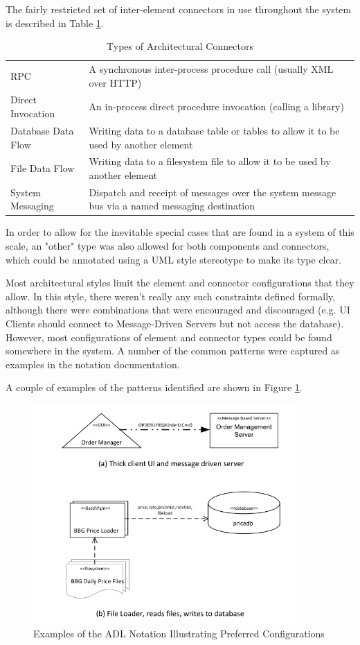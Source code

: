 The fairly restricted set of inter-element connectors in use throughout the system is described in Table \ref{table:archconntypes}.


\begin{table}
\caption{Types of Architectural Connectors}
\label{table:archconntypes}
\footnotesize
\begin{tabular}{| l p{10cm} |}
\hline
RPC                & A synchronous inter-process procedure call (usually XML over HTTP) \\
Direct Invocation  & An in-process direct procedure invocation (calling a library) \\
Database Data Flow & Writing data to a database table or tables to allow it to be used by another element \\
File Data Flow     & Writing data to a filesystem file to allow it to be used by another element \\
System Messaging   &  Dispatch and receipt of messages over the system message bus via a named messaging destination \\
\hline
\end{tabular}
\end{table}

  In order to allow for the inevitable special cases that are found in a system of this scale, an "other" type was also allowed for both components and connectors, which could be annotated using a UML style stereotype to make its type clear.

  Most architectural styles limit the element and connector configurations that they allow.  In this style, there weren't really any such constraints defined formally, although there were combinations that were encouraged and discouraged (e.g. UI Clients should connect to Message-Driven Servers but not access the database).  However, most configurations of element and connector types could be found somewhere in the system. A number of the common patterns were captured as examples in the notation documentation.

  A couple of examples of the patterns identified are shown in Figure \ref{figure:adlnotation1}. 

\begin{figure}[h]
\centering
\includegraphics[width=10cm]{Figures/adls-figure1}
\caption{Examples of the ADL Notation Illustrating Preferred Configurations}
\label{figure:adlnotation1}
\end{figure}  

